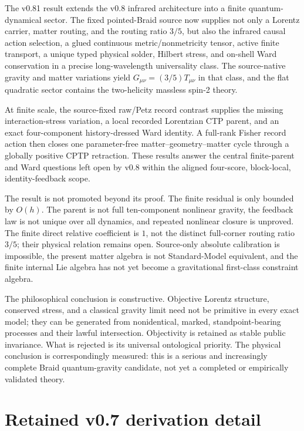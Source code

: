 \documentclass[11pt]{article}
\theoremstyle{definition}
\theoremstyle{remark}
\begin{document}
The v0.81 result extends the v0.8 infrared architecture into a finite quantum-dynamical sector. The fixed pointed-Braid source now supplies not only a Lorentz carrier, matter routing, and the routing ratio $3/5$, but also the infrared causal action selection, a glued continuous metric/nonmetricity tensor, active finite transport, a unique typed physical solder, Hilbert stress, and on-shell Ward conservation in a precise long-wavelength universality class. The source-native gravity and matter variations yield $G_{\mu\nu}=(3/5)T_{\mu\nu}$ in that class, and the flat quadratic sector contains the two-helicity massless spin-2 theory.

At finite scale, the source-fixed raw/Petz record contrast supplies the missing interaction-stress variation, a local recorded Lorentzian CTP parent, and an exact four-component history-dressed Ward identity. A full-rank Fisher record action then closes one parameter-free matter--geometry--matter cycle through a globally positive CPTP retraction. These results answer the central finite-parent and Ward questions left open by v0.8 within the aligned four-score, block-local, identity-feedback scope.

The result is not promoted beyond its proof. The finite residual is only bounded by $O(h)$. The parent is not full ten-component nonlinear gravity, the feedback law is not unique over all dynamics, and repeated nonlinear closure is unproved. The finite direct relative coefficient is $1$, not the distinct full-corner routing ratio $3/5$; their physical relation remains open. Source-only absolute calibration is impossible, the present matter algebra is not Standard-Model equivalent, and the finite internal Lie algebra has not yet become a gravitational first-class constraint algebra.

The philosophical conclusion is constructive. Objective Lorentz structure, conserved stress, and a classical gravity limit need not be primitive in every exact model; they can be generated from nonidentical, marked, standpoint-bearing processes and their lawful intersection. Objectivity is retained as stable public invariance. What is rejected is its universal ontological priority. The physical conclusion is correspondingly measured: this is a serious and increasingly complete Braid quantum-gravity candidate, not yet a completed or empirically validated theory.

\appendix
\section*{Retained v0.7 derivation detail}
\end{document}
